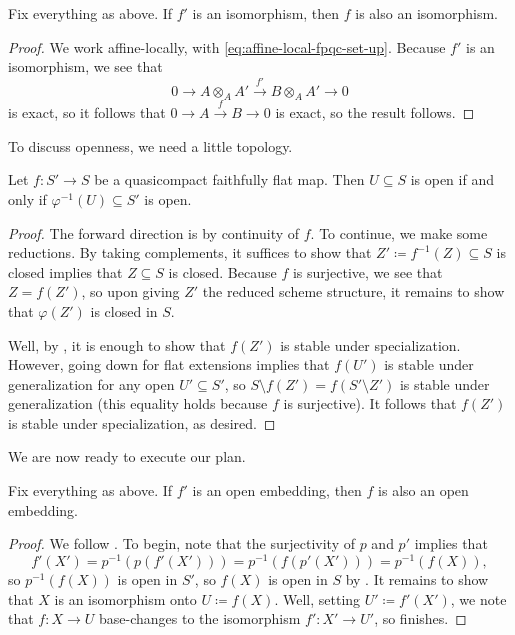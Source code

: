 \documentclass{amsart}
\begin{document}
\begin{lemma} \label{lem:iso-descent}
    Fix everything as above. If $f'$ is an isomorphism, then $f$ is also an isomorphism.
\end{lemma}
\begin{proof}
    We work affine-locally, with \eqref{eq:affine-local-fpqc-set-up}. Because $f'$ is an isomorphism, we see that
    \[0\to A\otimes_AA'\stackrel{f'}\to B\otimes_AA'\to0\]
    is exact, so it follows that $0\to A\stackrel f\to B\to0$ is exact, so the result follows.
\end{proof}
To discuss openness, we need a little topology.
\begin{lemma} \label{lem:fpqc-quotient-top}
    Let $f\colon S'\to S$ be a quasicompact faithfully flat map. Then $U\subseteq S$ is open if and only if $\varphi^{-1}(U)\subseteq S'$ is open.
\end{lemma}
\begin{proof}
    The forward direction is by continuity of $f$. To continue, we make some reductions. By taking complements, it suffices to show that $Z'\coloneqq f^{-1}(Z)\subseteq S$ is closed implies that $Z\subseteq S$ is closed. Because $f$ is surjective, we see that $Z=f(Z')$, so upon giving $Z'$ the reduced scheme structure, it remains to show that $\varphi(Z')$ is closed in $S$.
    
    Well, by \cite[Lemma~II.4.5]{hartshorne}, it is enough to show that $f(Z')$ is stable under specialization. However, going down for flat extensions \cite[Lemma~10.11]{eisenbud-comm-alg} implies that $f(U')$ is stable under generalization for any open $U'\subseteq S'$, so $S\setminus f(Z')=f(S'\setminus Z')$ is stable under generalization (this equality holds because $f$ is surjective). It follows that $f(Z')$ is stable under specialization, as desired.
\end{proof}
We are now ready to execute our plan.
\begin{lemma} \label{lem:open-descent}
    Fix everything as above. If $f'$ is an open embedding, then $f$ is also an open embedding.
\end{lemma}
\begin{proof}
    We follow \cite{emerton-descent}. To begin, note that the surjectivity of $p$ and $p'$ implies that
    \[f'(X')=p^{-1}(p(f'(X')))=p^{-1}(f(p'(X')))=p^{-1}(f(X)),\]
    so $p^{-1}(f(X))$ is open in $S'$, so $f(X)$ is open in $S$ by . It remains to show that $X$ is an isomorphism onto $U\coloneqq f(X)$. Well, setting $U'\coloneqq f'(X')$, we note that $f\colon X\to U$ base-changes to the isomorphism $f'\colon X'\to U'$, so  finishes.
\end{proof}
\end{document}
